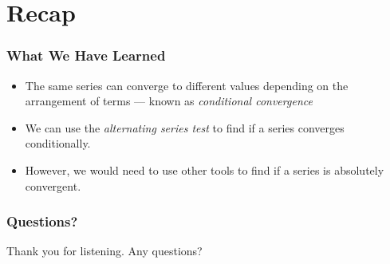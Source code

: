 \documentclass{beamer}
\begin{document}
\section{Recap}
\begin{frame}
  \frametitle{What We Have Learned}
  \begin{itemize}
    \item<1-> The same series can converge to different values depending on the arrangement of terms --- known as \textit{conditional convergence}
    \item<2-> We can use the \textit{alternating series test} to find if a series converges conditionally.
    \item<3-> However, we would need to use other tools to find if a series is absolutely convergent.
  \end{itemize}
\end{frame}
\begin{frame}
  \frametitle{Questions?}
  Thank you for listening. Any questions?
\end{frame}
\end{document}
